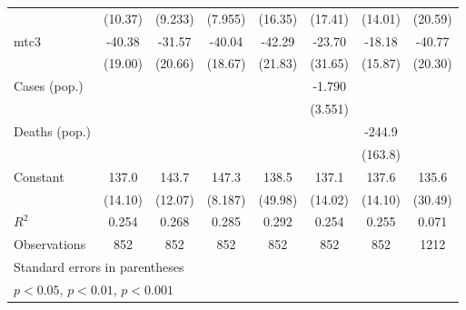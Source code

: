 \documentclass{article}
\begin{document}
{\begin{longtable}{l*{7}{c}}
                &  (10.37)         &  (9.233)         &  (7.955)         &  (16.35)         &  (17.41)         &  (14.01)         &  (20.59)         \\
mtc3            &   -40.38         &   -31.57         &   -40.04         &   -42.29         &   -23.70         &   -18.18         &   -40.77         \\
                &  (19.00)         &  (20.66)         &  (18.67)         &  (21.83)         &  (31.65)         &  (15.87)         &  (20.30)         \\
Cases (pop.)    &                  &                  &                  &                  &   -1.790         &                  &                  \\
                &                  &                  &                  &                  &  (3.551)         &                  &                  \\
Deaths (pop.)   &                  &                  &                  &                  &                  &   -244.9         &                  \\
                &                  &                  &                  &                  &                  &  (163.8)         &                  \\
Constant        &    137.0\sym{***}&    143.7\sym{***}&    147.3\sym{***}&    138.5\sym{*}  &    137.1\sym{***}&    137.6\sym{***}&    135.6\sym{**} \\
                &  (14.10)         &  (12.07)         &  (8.187)         &  (49.98)         &  (14.02)         &  (14.10)         &  (30.49)         \\
\hline
\(R^{2}\)       &    0.254         &    0.268         &    0.285         &    0.292         &    0.254         &    0.255         &    0.071         \\
Observations    &      852         &      852         &      852         &      852         &      852         &      852         &     1212         \\
\hline\hline
\multicolumn{8}{l}{\footnotesize Standard errors in parentheses}\\
\multicolumn{8}{l}{\footnotesize \sym{*} \(p<0.05\), \sym{**} \(p<0.01\), \sym{***} \(p<0.001\)}\\
\end{longtable}
}
\end{document}

